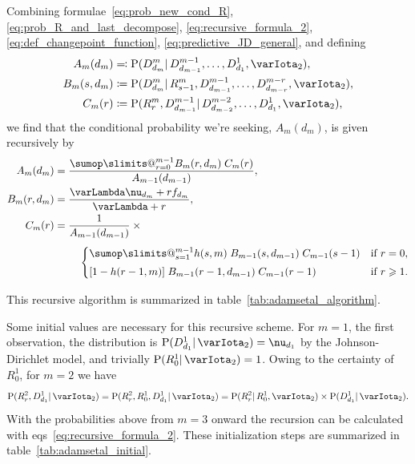 \documentclass[\ifafour a4paper,12pt,\else a5paper,10pt,\fi%
onecolumn,oneside,article,%
british%
]{memoir}
\makeatletter
\theoremstyle{remark}
\theoremstyle{innote}
\def\sum{\DOTSI\sumop\slimits@}
\newcommand*{\defd}{\coloneqq}
\newcommand*{\defs}{\eqqcolon}
\renewcommand{\ge}{\geqslant}%
\newcommand*{\p}{\mathrm{P}}%
\renewcommand*{\|}{\mathpunct{|}}
\newcommand*{\eqns}{eqs}%
\newcommand*{\yff}{f}
\newcommand*{\yI}{\varIota}
\newcommand*{\yMc}{\yI_2}
\newcommand*{\yN}{\varLambda}
\newcommand*{\ynn}{\nu}
\newcommand*{\yrs}{h}
\makeatother
\begin{document}
Combining formulae~\eqref{eq:prob_new_cond_R},
\eqref{eq:prob_R_and_last_decompose}, \eqref{eq:recursive_formula_2},
\eqref{eq:def_changepoint_function}, \eqref{eq:predictive_JD_general}, and
defining
\begin{subequations}\label{eq:definitions_ABC}
  \begin{align}
    \label{eq:def_A}
    A_{m}(d_{m}) &\defs
    \p(D^{m}_{d_{m}} \| D^{m-1}_{d_{m-1}}, \dotsc, D^{1}_{d_{1}}, \yMc),
    \\
    B_{m}(s,d_{m})
                 &\defd \p(D^{m}_{d_{m}} \| R^{m}_{s-1}, D^{m-1}_{d_{m-1}},
                   \dotsc, D^{m-r}_{d_{m-r}}, \yMc),
    \\
    C_{m}(r) &\defd
            \p(R^{m}_{r} , D^{m-1}_{d_{m-1}} \| D^{m-2}_{d_{m-2}}, \dotsc,
            D^{1}_{d_{1}}, \yMc),
  \end{align}
\end{subequations}
we find that the conditional probability we're seeking, $A_{m}(d_{m})$, is
given recursively by
\begin{subequations}\label{eq:recursive_formula_2}
\begin{align}
  A_{m}(d_{m})
  &= \frac{\sum_{r=0}^{m-1} B_{m}(r,d_{m}) \; C_{m}(r)}{A_{m-1}(d_{m-1})},
  \\
  B_{m}(r,d_{m})  &= \frac{\yN\ynn_{d_{m}}+r\yff_{d_{m}}}{\yN + r},
  \\
  C_{m}(r)
  &=   \!\begin{multlined}[t][0.5\linewidth]
\frac{1}{A_{m-1}(d_{m-1})} \times{}\\[\jot]
    \begin{cases}
      \sum_{s=1}^{m-1} \yrs(s,m) \; B_{m-1}(s,d_{m-1}) \;
      C_{m-1}(s-1)
      & \text{if $r=0$},
      \\[\jot]
      [1-\yrs(r-1,m)]  \; B_{m-1}(r-1,d_{m-1}) \; C_{m-1}(r-1)
      & \text{if $r\ge 1$}.
    \end{cases}
  \end{multlined}
\end{align}
\end{subequations}

This recursive algorithm is summarized in table~\ref{tab:adamsetal_algorithm}.

\bigskip

Some initial values are necessary for this recursive scheme. For $m=1$, the
first observation, the distribution is $\p(D^{1}_{d_1} \| \yMc)=\ynn_{d_1}$
by the Johnson-Dirichlet model, and trivially $\p(R^{1}_{0} \| \yMc)=1$.
Owing to the certainty of $R^1_0$, for $m=2$ we have
\begin{equation}
  \label{eq:initial_R2}
  \p(R^{2}_{r}, D^{1}_{d_{1}} \|  \yMc)
  = \p(R^{2}_{r},R^{1}_{0}, D^{1}_{d_{1}} \|  \yMc)
  = \p(R^{2}_{r} \| R^{1}_{0},  \yMc) \times
  \p( D^{1}_{d_{1}} \|  \yMc).
\end{equation}
With the probabilities above from $m=3$ onward the recursion can be
calculated with \eqns~\eqref{eq:recursive_formula_2}. These initialization
steps are summarized in table~\ref{tab:adamsetal_initial}.
\end{document}
